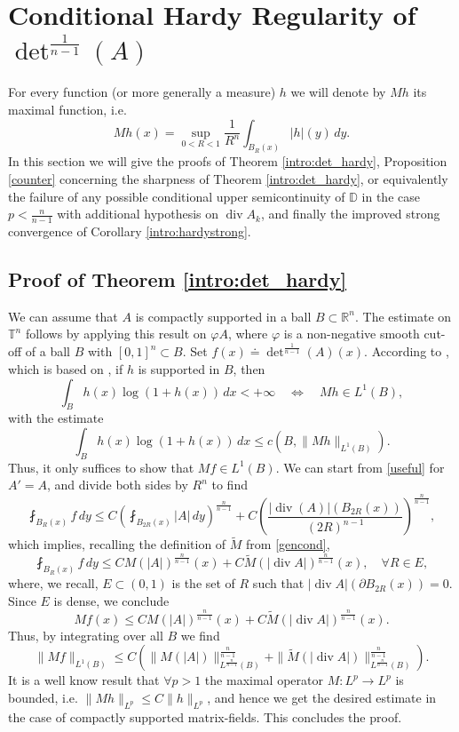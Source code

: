 \documentclass[10pt,reqno]{amsart}
\numberwithin{equation}{section}
\newcommand{\R}{\mathbb{R}}
\newcommand{\T}{\mathbb{T}}
\newcommand{\D}{\mathbb{D}}
\DeclareMathOperator{\dv}{div}
\theoremstyle{plain}
\theoremstyle{definition}
\theoremstyle{remark}
\begin{document}
\section{Conditional Hardy Regularity of $\det^\frac{1}{n-1}(A)$}\label{hardy}

For every function (or more generally a measure) $h$ we will denote by $Mh$ its maximal function, i.e.
$$
Mh(x) = \sup_{0 <R <1}\frac{1}{R^n}\int_{B_R(x)}|h|(y)\,dy.
$$
In this section we will give the proofs of Theorem \ref{intro:det_hardy}, Proposition \ref{counter} concerning the sharpness of Theorem \ref{intro:det_hardy}, or equivalently the failure of any possible conditional upper semicontinuity of $\D$ in the case $p<\frac{n}{n-1}$ with additional hypothesis on $\dv A_k$, and finally the improved strong convergence of Corollary \ref{intro:hardystrong}.

\subsection{Proof of Theorem \ref{intro:det_hardy}}

We can assume that $A$ is compactly supported in a ball $B \subset \R^n$. The estimate on $\T^n$ follows by applying this result on $\varphi A$, where $\varphi$ is a non-negative smooth cut-off of a ball $B$ with $[0,1]^n \subset B$. Set $f(x) \doteq {\det}^{\frac{1}{n-1}}(A)(x)$. According to \cite[Lemma 3]{MULDETPOS}, which is based on \cite{STE}, if $h$ is supported in $B$, then
\begin{equation}\label{iff}
\int_{B}h(x)\log(1 + h(x))\, dx < + \infty\quad  \Leftrightarrow \quad Mh \in L^1(B),
\end{equation}
with the estimate
\begin{equation*}
\int_{B}h(x)\log(1 + h(x)) \,dx \le c(B,\|Mh\|_{L^1(B)}).
\end{equation*}
Thus, it only suffices to show that
$Mf \in L^1(B)$.
We can start from \eqref{useful} for $A' = A$, and divide both sides by $R^n$ to find
\begin{equation}\label{usefulresc}
\fint_{B_R(x)}f\,dy \le C\left(\fint_{B_{2R}(x)}|A|\,dy\right)^\frac{n}{n -1} + C\left(\frac{|\dv(A)|(B_{2R}(x))}{(2R)^{n-1}}\right)^\frac{n}{n - 1},
\end{equation}
which implies, recalling the definition of $\tilde M$ from \eqref{gencond},
\[
\fint_{B_R(x)}f\,dy \le C M(|A|)^\frac{n}{n - 1}(x) + C \tilde M (|\dv A|)^\frac{n}{n - 1}(x), \quad \forall R \in E,
\]
where, we recall, $E \subset (0,1)$ is the set of $R$ such that
$|\dv A|(\partial B_{2R}(x)) = 0$.
Since $E$ is dense, we conclude
\[
Mf(x) \le C M(|A|)^\frac{n}{n - 1}(x) + C \tilde M (|\dv A|)^\frac{n}{n - 1}(x).
\]
Thus, by integrating over all $B$ we find
\[
\|Mf\|_{L^1(B)} \le C\left(\|M(|A|)\|^\frac{n}{n-1}_{L^\frac{n}{n - 1}(B)} + \| \tilde M (| \dv A|) \|^\frac{n}{n-1}_{L^\frac{n}{n - 1}(B)}\right).
\]
It is a well know result that $\forall p>1$ the maximal operator $M:L^p\rightarrow L^p$ is bounded, i.e. $\| M h\|_{L^p}\leq C \|h\|_{L^p}$,
and hence we get the desired estimate in the case of compactly supported matrix-fields. This concludes the proof.
\end{document}

